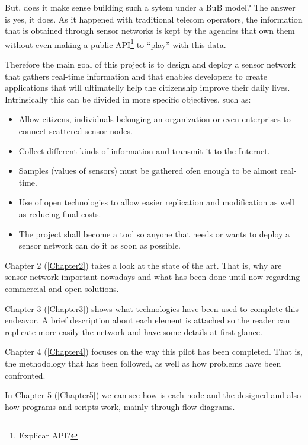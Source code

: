 But, does it make sense building such a sytem under a BuB model? The answer is yes, it does. As it happened with traditional telecom operators, the information that is obtained through sensor networks is kept by the agencies that own them without even making a public API\footnote{Explicar API?} to ``play'' with this data.

Therefore the main goal of this project is to design and deploy a sensor network that gathers real-time information and that enables developers to create applications that will ultimatelly help the citizenship improve their daily lives. Intrinsically this can be divided in more specific objectives, such as:

\begin{itemize}
    \item Allow citizens, individuals belonging an organization or even enterprises to connect scattered sensor nodes.
    \item Collect different kinds of information and transmit it to the Internet.
    \item Samples (values of sensors) must be gathered ofen enough to be almost real-time.
    \item Use of open technologies to allow easier replication and modification as well as reducing final costs.
    \item The project shall become a tool so anyone that needs or wants to deploy a sensor network can do it as soon as possible.
\end{itemize}

Chapter 2 (\ref{Chapter2}) takes a look at the state of the art. That is, why are sensor network important nowadays and what has been done until now regarding commercial and open solutions.

Chapter 3 (\ref{Chapter3}) shows what technologies have been used to complete this endeavor. A brief description about each element is attached so the reader can replicate more easily the network and have some details at first glance.

Chapter 4 (\ref{Chapter4}) focuses on the way this pilot has been completed. That is, the methodology that has been followed, as well as how problems have been confronted.

In Chapter 5 (\ref{Chapter5}) we can see how is each node and the designed and also how programs and scripts work, mainly through flow diagrams.
